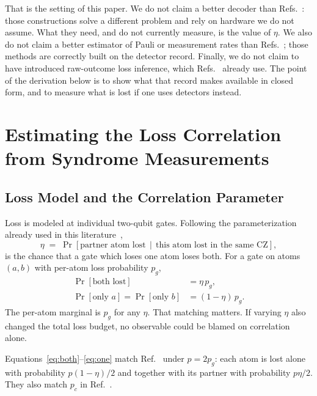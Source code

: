 \documentclass{ieeeaccess}
\begin{document}
That is the setting of this paper. We do not claim a better decoder than
Refs.~\cite{perrin2026correlatedloss,liu2026optimaldistanceatomloss}: those
constructions solve a different problem and rely on hardware we do not assume.
What they need, and do not currently measure, is the value of $\eta$. We also
do not claim a better estimator of Pauli or measurement rates than
Refs.~\cite{spitz2018adaptiveweight,blumekohout2025detectorerrormodels}; those
methods are correctly built on the detector record. Finally, we do not claim
to have introduced raw-outcome loss inference, which
Refs.~\cite{bultink2020repetitiveparity,varbanov2020leakagedetection,wang2026aiqubitloss}
already use. The point of the derivation below is to show what that record
makes available in closed form, and to measure what is lost if one uses
detectors instead.


\section{Estimating the Loss Correlation from Syndrome Measurements}
\label{sec:theory}

\subsection{Loss Model and the Correlation Parameter}
\label{sec:theory-model}

Loss is modeled at individual two-qubit gates. Following the parameterization
already used in this
literature~\cite{perrin2026correlatedloss,liu2026optimaldistanceatomloss},
\begin{equation}
  \eta \;=\; \Pr\!\left[\text{partner atom lost} \,\middle|\, \text{this atom lost in the same CZ}\right],
  \label{eq:eta-def}
\end{equation}
is the chance that a gate which loses one atom loses both. For a gate on atoms
$(a,b)$ with per-atom loss probability $p_g$,
\begin{align}
  \Pr[\text{both lost}] &= \eta\,p_g, \label{eq:both}\\
  \Pr[\text{only } a] = \Pr[\text{only } b] &= (1-\eta)\,p_g. \label{eq:one}
\end{align}
The per-atom marginal is $p_g$ for any $\eta$. That matching matters. If
varying $\eta$ also changed the total loss budget, no observable could be
blamed on correlation alone.

Equations~\eqref{eq:both}--\eqref{eq:one} match
Ref.~\cite{liu2026optimaldistanceatomloss} under $p=2p_g$: each atom is lost
alone with probability $p(1-\eta)/2$ and together with its partner with
probability $p\eta/2$. They also match $p_c$ in
Ref.~\cite{perrin2026correlatedloss}.
\end{document}
